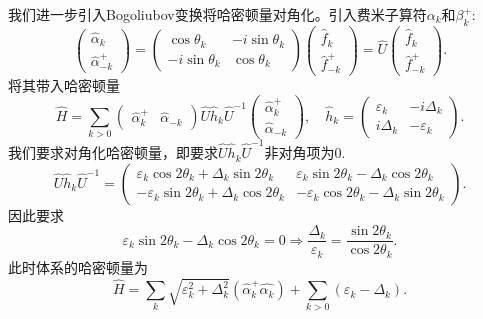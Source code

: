 \documentclass[12pt]{article}
\begin{document}
      我们进一步引入Bogoliubov变换将哈密顿量对角化。引入费米子算符$\alpha_k$和$\beta_k^+$:
      \begin{equation}\begin{pmatrix} \hat{\alpha}_k\\ \hat{\alpha}_{-k}^+\end{pmatrix}= \begin{pmatrix} \cos\theta_k&-i\sin\theta_k\\-i\sin\theta_k&\cos\theta_k\end{pmatrix} \begin{pmatrix} \hat{f}_k\\\hat{f}_{-k}^+ \end{pmatrix} = \hat{U}\begin{pmatrix} \hat{f}_k\\\hat{f}_{-k}^+ \end{pmatrix}.\end{equation}
      将其带入哈密顿量
      \begin{equation}\hat{H}=\sum_{k>0}\begin{pmatrix} \hat{\alpha}_k^+&\hat{\alpha}_{-k}\end{pmatrix} \hat{U}\hat{h}_k\hat{U}^{-1}\begin{pmatrix} \hat{\alpha}_k^+\\\hat{\alpha}_{-k}\end{pmatrix},\quad \hat{h}_k=\begin{pmatrix} \varepsilon_k&-i\Delta_k\\i\Delta_k&-\varepsilon_k\end{pmatrix} .\end{equation}
      我们要求对角化哈密顿量，即要求$\hat{U}\hat{h}_k\hat{U}^{-1}$非对角项为0.
      \begin{equation}\hat{U}\hat{h}_k\hat{U}^{-1}=\begin{pmatrix} \varepsilon_k\cos2\theta_k+\Delta_k\sin2\theta_k&\varepsilon_k\sin2\theta_k-\Delta_k\cos2\theta_k\\-\varepsilon_k\sin2\theta_k+\Delta_k\cos2\theta_k&-\varepsilon_k\cos2\theta_k-\Delta_k\sin2\theta_k \end{pmatrix} .\end{equation}
      因此要求
      \begin{equation}\varepsilon_k\sin2\theta_k-\Delta_k\cos2\theta_k=0\Rightarrow\frac{\Delta_k}{\varepsilon_k}=\frac{\sin2\theta_k}{\cos2\theta_k} .\end{equation}
      此时体系的哈密顿量为
      \begin{equation}\hat{H}=\sum_{k}\sqrt{\varepsilon_k^2+\Delta_k^2}(\hat\alpha_k^+\hat{\alpha_k})+\sum_{k>0}(\varepsilon_k-\Delta_k) .\end{equation}
      
\end{document}
